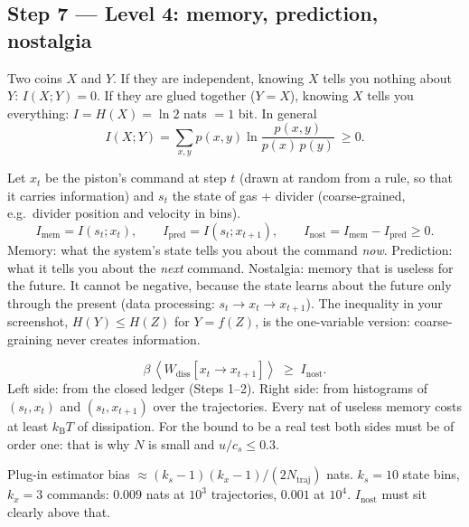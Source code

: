 \documentclass[11pt,a4paper]{article}
\newcommand{\kT}{k_{\mathrm B}T}
\newcommand{\avg}[1]{\left\langle #1 \right\rangle}
\begin{document}
\subsection{Step 7 --- Level 4: memory, prediction, nostalgia}
\begin{eli}
Two coins $X$ and $Y$. If they are independent, knowing $X$ tells you nothing about $Y$: $I(X;Y) = 0$. If they are glued together ($Y = X$), knowing $X$ tells you everything: $I = H(X) = \ln2$ nats $= 1$ bit. In general
\begin{equation}
I(X;Y) = \sum_{x,y}p(x,y)\ln\frac{p(x,y)}{p(x)\,p(y)}\ \ge 0 .
\end{equation}
\end{eli}
\begin{eli}
Let $x_t$ be the piston's command at step $t$ (drawn at random from a rule, so that it carries information) and $s_t$ the state of gas + divider (coarse-grained, e.g.\ divider position and velocity in bins).
\begin{equation}
I_{\mathrm{mem}} = I(s_t;x_t),\qquad I_{\mathrm{pred}} = I(s_t;x_{t+1}),\qquad I_{\mathrm{nost}} = I_{\mathrm{mem}} - I_{\mathrm{pred}} \ge 0 .
\end{equation}
Memory: what the system's state tells you about the command \emph{now}. Prediction: what it tells you about the \emph{next} command. Nostalgia: memory that is useless for the future. It cannot be negative, because the state learns about the future only through the present (data processing: $s_t\to x_t\to x_{t+1}$). The inequality in your screenshot, $H(Y)\le H(Z)$ for $Y = f(Z)$, is the one-variable version: coarse-graining never creates information.
\end{eli}
\begin{eli}
\begin{equation}
\beta\,\avg{W_{\mathrm{diss}}[x_t\to x_{t+1}]} \;\ge\; I_{\mathrm{nost}} .
\end{equation}
Left side: from the closed ledger (Steps 1--2). Right side: from histograms of $(s_t, x_t)$ and $(s_t, x_{t+1})$ over the trajectories. Every nat of useless memory costs at least $\kT$ of dissipation. For the bound to be a real test both sides must be of order one: that is why $N$ is small and $u/c_s\le0.3$.
\end{eli}
\begin{num}
Plug-in estimator bias $\approx (k_s-1)(k_x-1)/(2N_{\mathrm{traj}})$ nats. $k_s = 10$ state bins, $k_x = 3$ commands: $0.009$ nats at $10^3$ trajectories, $0.001$ at $10^4$. $I_{\mathrm{nost}}$ must sit clearly above that.
\end{num}
\end{document}
